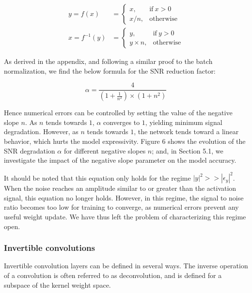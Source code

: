 \documentclass[twocolumn]{bmcart}
\begin{document}
\begin{subequations}
\begin{align}
y = f(x) &=      \begin{cases}
x, & \text{if}\ x>0 \\
x / n, & \text{otherwise}
\end{cases} \\
x = f^{-1}(y) &= \begin{cases}
y, & \text{if}\ y>0 \\
y \times n, & \text{otherwise}
\end{cases}
\end{align}
\end{subequations}

As derived in the appendix, and following a similar proof to the batch normalization,
we find the below formula for the SNR reduction factor:

\begin{equation}
\alpha = \frac{4}{(1+\frac{1}{n^2}) \times (1 + n^2)}
\end{equation}

Hence numerical errors can be controlled by setting the value of the negative slope $n$.
As $n$ tends towards $1$, $\alpha$ converges to $1$, yielding minimum signal degradation.
However, as $n$ tends towards $1$, the network tends toward a linear behavior, which hurts the model expressivity.
Figure 6 shows the evolution of the SNR degradation $\alpha$ for different negative slopes $n$;
and, in Section 5.1, we investigate the impact of the negative slope parameter on the model accuracy.

It should be noted that this equation only holds for the regime $|y|^2 >> |\epsilon_y|^2$.
When the noise reaches an amplitude similar to or greater than the activation signal, this equation no longer holds.
However, in this regime, the signal to noise ratio becomes too low for training to converge,
as numerical errors prevent any useful weight update.
We have thus left the problem of characterizing this regime open.

\subsubsection{Invertible convolutions}

Invertible convolution layers can be defined in several ways.
The inverse operation of a convolution is often referred to as deconvolution,
and is defined for a subspace of the kernel weight space.
\end{document}

